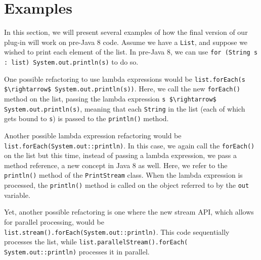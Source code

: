 \section{Examples}

In this section, we will present several examples of how the final version of
our plug-in will work on pre-Java 8 code. Assume we have a \lstinline{List},
and suppose we wished to print each element of the list. In pre-Java 8,
we can use \lstinline{for (String s : list) System.out.println(s)} to do so.

One possible refactoring to use lambda expressions would be
\lstinline{list.forEach(s $\rightarrow$ System.out.println(s))}.
Here, we call the new \lstinline{forEach()} method on the list, passing the
lambda expression \lstinline{s $\rightarrow$ System.out.println(s)}, meaning that each
\lstinline{String} in the list (each of which gets bound to \lstinline{s}) is
passed to the \lstinline{println()} method. 

Another possible lambda expression refactoring would be
\lstinline{list.forEach(System.out::println)}. In this case, we again call the
\lstinline{forEach()} on the list but this time, instead of passing a lambda
expression, we pass a method reference, a new concept in Java 8 as well. Here,
we refer to the \lstinline{println()} method of the \lstinline{PrintStream}
class. When the lambda expression is processed, the \lstinline{println()}
method is called on the object referred to by the \lstinline{out} variable.

Yet, another possible refactoring is one where the new stream API, which
allows for parallel processing, would be
\lstinline{list.stream().forEach(System.out::println)}. This code sequentially
processes the list, while
\lstinline{list.parallelStream().forEach( System.out::println)} processes it in
parallel.
